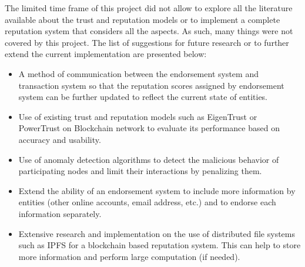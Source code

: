 The limited time frame of this project did not allow to explore all the literature available about the trust and reputation models or to implement a complete reputation system that considers all the aspects. As such, many things were not covered by this project. The list of suggestions for future research or to further extend the current implementation are presented below: 
\begin{itemize}
	\item A method of communication between the endorsement system and
	transaction system so that the reputation scores assigned by endorsement
	system can be further updated to reflect the current state of entities. 
	\item Use of existing trust and reputation models such as EigenTrust or
	PowerTrust on Blockchain network to evaluate its performance based on
	accuracy and usability.
	\item Use of anomaly detection algorithms to detect the malicious behavior
	of participating nodes and limit their interactions by penalizing them. 
	\item Extend the ability of an endorsement system to include more
	information by entities (other online accounts, email address, etc.) and to
	endorse each information separately. 
	\item Extensive research and implementation on the use of distributed file
	systems such as IPFS for a blockchain based reputation system. This can
	help to store more information and perform large computation (if needed). 
\end{itemize}
